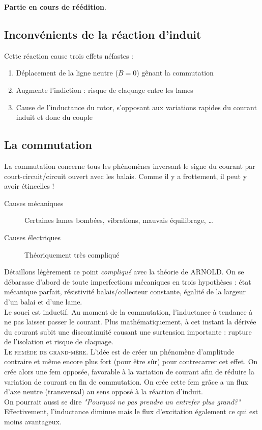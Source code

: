 		\textbf{Partie en cours de réédition}.
		
		
\newpage

	\subsection{Inconvénients de la réaction d'induit}
	Cette réaction cause trois effets néfastes :
	\begin{enumerate}
	\item Déplacement de la ligne neutre ($B=0$) gênant la commutation
	\item Augmente l'indiction : risque de claquage entre les lames
	\item Cause de l'inductance du rotor, s’opposant aux variations rapides 
	du courant induit et donc du couple
	\end{enumerate}
	
	
	\subsection{La commutation}
	La commutation concerne tous les phénomènes inversant le signe du courant 
	par court-circuit/circuit ouvert avec les balais. Comme il y a frottement, 
	il peut y avoir étincelles !
	
	\begin{description}
	\item[Causes mécaniques] Certaines lames bombées, vibrations, mauvais 
	équilibrage, \dots
	\item[Causes électriques] Théoriquement très compliqué
	\end{description}
	Détaillons légèrement ce point \textit{compliqué} avec la théorie de ARNOLD. 
	On se débarasse d'abord de toute imperfections mécaniques en trois hypothèses :
	état mécanique parfait, résistivité balais/collecteur constante, égalité de 
	la largeur d'un balai et d'une lame.\\
	
	Le souci est inductif. Au moment de la commutation, l'inductance à tendance 
	à ne pas laisser passer le courant. Plus mathématiquement, à cet instant la 
	dérivée du courant subit une discontinuité causant une surtension importante : 
	rupture de l’isolation et risque de claquage.\\
	
	\textsc{Le remède de grand-mère}. L'idée est de créer un phénomène d'amplitude 
	contraire et même encore plus fort (pour être sûr) pour contrecarrer cet 
	effet. On crée alors une fem opposée, favorable à la variation de courant afin 
	de réduire la variation de courant en fin de commutation. On crée cette fem 
	grâce a un flux d'axe neutre (transversal) au sens opposé à la réaction d'induit.\\
	On pourrait aussi se dire \textit{"Pourquoi ne pas prendre un entrefer plus grand?"} 
	Effectivement, l'inductance diminue mais le flux d'excitation également ce qui 
	est moins avantageux.
		


